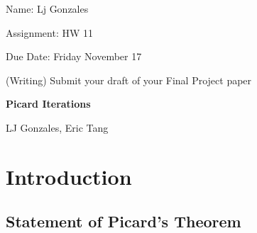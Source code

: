 \documentclass[11 pt]{article}
\begin{document}
    Name: Lj Gonzales

    Assignment: HW 11

    Due Date: Friday November 17
    \break
\begin{problem}
	(Writing) Submit your draft of your Final Project paper
\end{problem}
\begin{solution}

\begin{center}{\bf Picard Iterations}\end{center}
\begin{center}{LJ Gonzales, Eric Tang}\end{center}

\begin{abstract}
Differential equations (equations involving an unknown function and at least one of its derivatives) are a fundamental framework to model the more complex systems of science and engineering. Solving such equations may be difficult or impossible, and even if we find an expression that solves the equation, there is no a priori guarantee that there does not exist a different expression that also satisfies the differential equation, and that other solution might be the one that actually characterizes our system. 

We present Picard’s Theorem of Existence and Uniqueness for solutions of first-order differential equations, which provides sufficient and very reasonable conditions on the form of the differential equation for solutions to exist and be unique.

Unlike our previous work dealing with specific functions and doing analysis on their derivatives, integrals, and long-term behavior, here we want a language that applies to all types of (differentiable) functions that might solve the differential equation; we need to go a level of abstraction beyond functions and consider the convergence of sequences in functional space.

We present the method of Picard Iterations on an integral version of the solution as a mathematically rigorous way to prove the theorem.
\end{abstract}

\section{Introduction}

\subsection{Statement of Picard's Theorem}


\end{solution}
\end{document}
